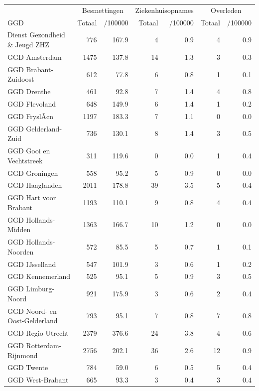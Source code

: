 \documentclass[
  english,
  man,floatsintext]{apa6}
\begin{document}
\begin{table}
\centering\begingroup\fontsize{10}{12}\selectfont

\begin{threeparttable}
\begin{tabular}{lrrrrrr}
\toprule
\multicolumn{1}{c}{ } & \multicolumn{2}{c}{Besmettingen} & \multicolumn{2}{c}{Ziekenhuisopnames} & \multicolumn{2}{c}{Overleden} \\
\cmidrule(l{3pt}r{3pt}){2-3} \cmidrule(l{3pt}r{3pt}){4-5} \cmidrule(l{3pt}r{3pt}){6-7}
GGD & Totaal & /100000 & Totaal & /100000 & Totaal & /100000\\
\midrule
Dienst Gezondheid \& Jeugd ZHZ & 776 & 167.9 & 4 & 0.9 & 4 & 0.9\\
GGD Amsterdam & 1475 & 137.8 & 14 & 1.3 & 3 & 0.3\\
GGD Brabant-Zuidoost & 612 & 77.8 & 6 & 0.8 & 1 & 0.1\\
GGD Drenthe & 461 & 92.8 & 7 & 1.4 & 4 & 0.8\\
GGD Flevoland & 648 & 149.9 & 6 & 1.4 & 1 & 0.2\\
GGD FryslÃ¢n & 1197 & 183.3 & 7 & 1.1 & 0 & 0.0\\
GGD Gelderland-Zuid & 736 & 130.1 & 8 & 1.4 & 3 & 0.5\\
GGD Gooi en Vechtstreek & 311 & 119.6 & 0 & 0.0 & 1 & 0.4\\
GGD Groningen & 558 & 95.2 & 5 & 0.9 & 0 & 0.0\\
GGD Haaglanden & 2011 & 178.8 & 39 & 3.5 & 5 & 0.4\\
GGD Hart voor Brabant & 1193 & 110.1 & 9 & 0.8 & 4 & 0.4\\
GGD Hollands-Midden & 1363 & 166.7 & 10 & 1.2 & 0 & 0.0\\
GGD Hollands-Noorden & 572 & 85.5 & 5 & 0.7 & 1 & 0.1\\
GGD IJsselland & 547 & 101.9 & 3 & 0.6 & 1 & 0.2\\
GGD Kennemerland & 525 & 95.1 & 5 & 0.9 & 3 & 0.5\\
GGD Limburg-Noord & 921 & 175.9 & 3 & 0.6 & 2 & 0.4\\
GGD Noord- en Oost-Gelderland & 793 & 95.1 & 7 & 0.8 & 7 & 0.8\\
GGD Regio Utrecht & 2379 & 376.6 & 24 & 3.8 & 4 & 0.6\\
GGD Rotterdam-Rijnmond & 2756 & 202.1 & 36 & 2.6 & 12 & 0.9\\
GGD Twente & 784 & 59.0 & 6 & 0.5 & 5 & 0.4\\
GGD West-Brabant & 665 & 93.3 & 3 & 0.4 & 3 & 0.4\\

\end{tabular}
\end{threeparttable}
\end{table}
\end{document}

